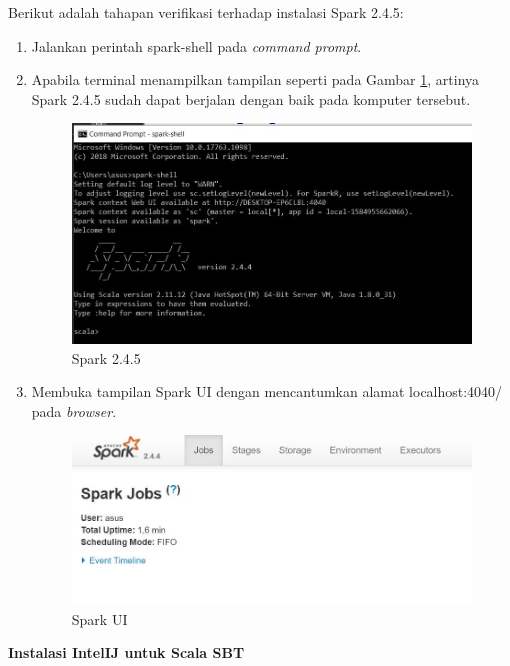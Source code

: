 \documentclass[a4paper,twoside]{article}
\begin{document}
\begin{enumerate}
\noindent Berikut adalah tahapan verifikasi terhadap instalasi Spark 2.4.5:
\begin{enumerate}
\item Jalankan perintah \textsf{spark-shell} pada \textit{command prompt}.

\item Apabila terminal menampilkan tampilan seperti pada Gambar \ref{fig:spark_instal_7}, artinya Spark 2.4.5 sudah dapat berjalan dengan baik pada komputer tersebut.

\begin{figure}[H]
	\centering
	\includegraphics[scale=0.65]{spark_instal_7}
	\caption{Spark 2.4.5}
	\label{fig:spark_instal_7}
\end{figure}

\item Membuka tampilan Spark UI dengan mencantumkan alamat \textsf{localhost:4040/}  pada \textit{browser}.

\begin{figure}[H]
	\centering
	\includegraphics[scale=0.65]{spark_ui}
	\caption{Spark UI}
	\label{fig:spark_ui}
\end{figure}

\end{enumerate}

\newpage
\textbf{Instalasi IntelIJ untuk Scala SBT}


\end{enumerate}
\end{document}
